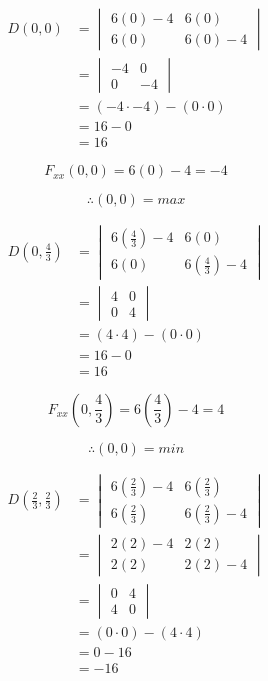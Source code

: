 \documentclass{article}
\begin{document}
\begin{enumerate}[a.]
	\begin{equation}
    \begin{split}
        D\left(0,0\right)&=\begin{vmatrix}6(0)-4&6(0)\\6(0)&6(0)-4\end{vmatrix} \\
    	&=\begin{vmatrix}-4&0\\0&-4\end{vmatrix}\\
    	&=(-4\cdot-4)-(0\cdot0)\\
    	&=16-0\\
    	&=16
    \end{split}
	\end{equation}
	
	\[F_{xx}(0,0)=6(0)-4=-4\]
	
	\[\therefore \left(0,0\right) = max\]
	
	\begin{equation}
    \begin{split}
        D\left(0,\frac{4}{3}\right)&=\begin{vmatrix}6(\frac{4}{3})-4&6(0)\\6(0)&6(\frac{4}{3})-4\end{vmatrix} \\
    	&=\begin{vmatrix}4&0\\0&4\end{vmatrix}\\
    	&=(4\cdot4)-(0\cdot0)\\
    	&=16-0\\
    	&=16
    \end{split}
	\end{equation}
	
	\[F_{xx}\left(0,\frac{4}{3}\right)=6\left(\frac{4}{3}\right)-4=4\]
	
	\[\therefore \left(0,0\right) = min\]
	
	\begin{equation}
    \begin{split}
        D\left(\frac{2}{3},\frac{2}{3}\right)&=\begin{vmatrix}6(\frac{2}{3})-4&6(\frac{2}{3})\\6(\frac{2}{3})&6(\frac{2}{3})-4\end{vmatrix} \\
    	&=\begin{vmatrix}2(2)-4&2(2)\\2(2)&2(2)-4\end{vmatrix}\\
    	&=\begin{vmatrix}0&4\\4&0\end{vmatrix}\\
    	&=(0\cdot0)-(4\cdot4)\\
    	&=0-16\\
    	&=-16
    \end{split}
	\end{equation}
	

\end{enumerate}
\end{document}
